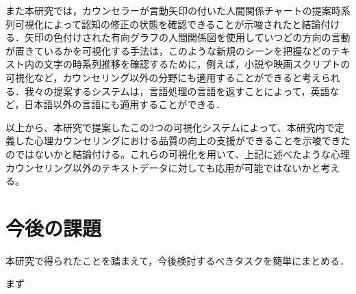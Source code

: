 \documentclass[shuuron]{kuee}
\begin{document}



また本研究では，カウンセラーが言動矢印の付いた人間関係チャートの提案時系列可視化によって認知の修正の状態を確認できることが示唆されたと結論付ける．矢印の色付けされた有向グラフの人間関係図を使用していつどの方向の言動が置きているかを可視化する手法は，このような新規のシーンを把握などのテキスト内の文字の時系列推移を確認するために，例えば，小説や映画スクリプトの可視化など，カウンセリング以外の分野にも適用することができると考えられる．我々の提案するシステムは，言語処理の言語を返すことによって，英語など，日本語以外の言語にも適用することができる．

以上から、本研究で提案したこの2つの可視化システムによって、本研究内で定義した心理カウンセリングにおける品質の向上の支援ができることを示唆できたのではないかと結論付ける。これらの可視化を用いて、上記に述べたような心理カウンセリング以外のテキストデータに対しても応用が可能ではないかと考える。


\section{今後の課題}

本研究で得られたことを踏まえて，今後検討するべきタスクを簡単にまとめる．

まず
\end{document}
